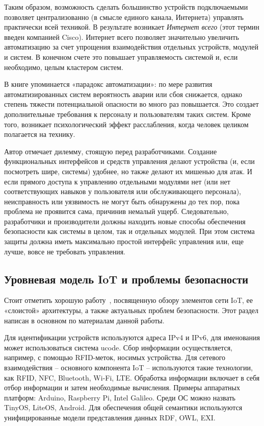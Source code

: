 Таким образом, возможность сделать большинство устройств подключаемыми позволяет централизованно (в смысле единого канала, Интернета) управлять практически всей техникой. В результате возникает \textit{Интернет всего} (этот термин введен компанией Cisco). Интернет всего позволяет значительно увеличить автоматизацию за счет упрощения взаимодействия отдельных устройств, модулей и систем. В конечном счете это повышает управляемость системой и, если необходимо, целым кластером систем.

В книге упоминается «парадокс автоматизации»: по мере развития автоматизированных систем вероятность аварии или сбоя снижается, однако степень тяжести потенциальной опасности во много раз повышается. Это создает дополнительные требования к персоналу и пользователям таких систем. Кроме того, возникает психологический эффект расслабления, когда человек целиком полагается на технику.

Автор отмечает дилемму, стоящую перед разработчиками. Создание функциональных интерфейсов и средств управления делают устройства (и, если посмотреть шире, системы) удобнее, но также делают их мишенью для атак. И если прямого доступа к управлению отдельными модулями нет (или нет соответствующих навыков у пользователя или обслуживающего персонала), неисправность или уязвимость не могут быть обнаружены до тех пор, пока проблема не проявится сама, причинив немалый ущерб. Следовательно, разработчики и производители должны находить новые способы обеспечения безопасности как системы в целом, так и отдельных модулей. При этом система защиты должна иметь максимально простой интерфейс управления или, еще лучше, вовсе не требовать управления.

\subsection{Уровневая модель IoT и проблемы безопасности} %

Стоит отметить хорошую работу~\cite{src20}, посвященную обзору элементов сети IoT, ее «слоистой» архитектуры, а также актуальных проблем безопасности. Этот раздел написан в основном по материалам данной работы.

Для идентификации устройств используются адреса IPv4 и IPv6, для именования может использоваться система ucode. Сбор информации осуществляется, например, с помощью RFID-меток, носимых устройства. Для сетевого взаимодействия – основного компонента IoT – используются такие технологии, как RFID, NFC, Bluetooth, Wi-Fi, LTE. Обработка информации включает в себя отбор информации и затем необходимые вычисления. Примеры аппаратных платформ: Arduino, Raspberry Pi, Intel Galileo. Среди ОС можно назвать TinyOS, LiteOS, Android. Для обеспечения общей семантики используются унифицированные модели представления данных RDF, OWL, EXI.


